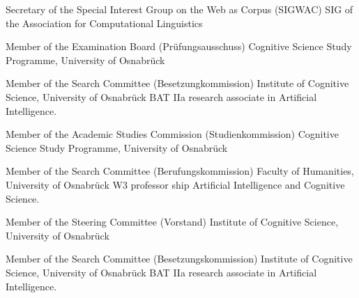 
        {Secretary of the Special Interest Group on the Web as Corpus (SIGWAC)}
        {}
        {SIG of the Association for Computational Linguistics}
        {}
        {}

        {Member of the Examination Board (Pr\"{u}fungsausschuss)}
        {}
        {Cognitive Science Study Programme, University of Osnabr\"{u}ck}
        {}
        {}

        {Member of the Search Committee (Besetzungkommission)}
        {}
        {Institute of Cognitive Science, University of Osnabr\"{u}ck}
        {}
        {BAT IIa research associate in Artificial Intelligence.}

        {Member of the Academic Studies Commission (Studienkommission)}
        {}
        {Cognitive Science Study Programme, University of Osnabr\"{u}ck}
        {}
        {}

        {Member of the Search Committee (Berufungskommission)}
        {}
        {Faculty of Humanities, University of Osnabr\"{u}ck}
        {}
        {W3 professor ship Artificial Intelligence and Cognitive Science.}

        {Member of the Steering Committee (Vorstand)}
        {}
        {Institute of Cognitive Science, University of Osnabr\"{u}ck}
        {}
        {}

        {Member of the Search Committee (Besetzungskommission)}
        {}
        {Institute of Cognitive Science, University of Osnabr\"{u}ck}
        {}
        {BAT IIa research associate in Artificial Intelligence.}

